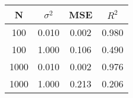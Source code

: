 \begin{tabular}{cccc}
\hline \hline
    N &  $\sigma^2$ &   MSE &  $R^2$ \\
\hline \hline
  100 &       0.010 & 0.002 &  0.980 \\
  100 &       1.000 & 0.106 &  0.490 \\
 1000 &       0.010 & 0.002 &  0.976 \\
 1000 &       1.000 & 0.213 &  0.206 \\
\hline \hline
\end{tabular}
